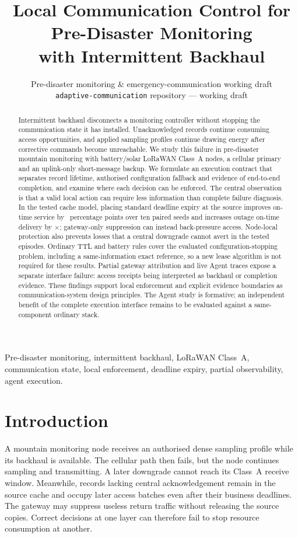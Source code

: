 \documentclass[journal,10pt]{IEEEtran}
\title{\textbf{Local Communication Control for Pre-Disaster Monitoring\\
with Intermittent Backhaul}}
\author{Pre-disaster monitoring \& emergency-communication working draft\\
\texttt{adaptive-communication} repository --- working draft}
\date{}
\begin{document}
\maketitle

\begin{abstract}
Intermittent backhaul disconnects a monitoring controller without stopping the communication
state it has installed. Unacknowledged records continue consuming access opportunities, and
applied sampling profiles continue drawing energy after corrective commands become unreachable.
We study this failure in pre-disaster mountain monitoring with battery/solar LoRaWAN Class~A
nodes, a cellular primary and an uplink-only short-message backup. We formulate an execution
contract that separates record lifetime, authorised configuration fallback and evidence of
end-to-end completion, and examine where each decision can be enforced. The central observation
is that a valid local action can require less information than complete failure diagnosis.
In the tested cache model, placing standard deadline expiry at the source improves on-time
service by \cThreePairedPoints\ percentage points over ten paired seeds and increases outage
on-time delivery by \cThreeRatio$\times$; gateway-only suppression can instead back-pressure
access. Node-local protection also prevents losses that a central downgrade cannot avert in
the tested episodes. Ordinary TTL and battery rules cover the evaluated configuration-stopping
problem, including a same-information exact reference, so a new lease algorithm is not required
for these results. Partial gateway attribution and live Agent traces expose a separate interface
failure: access receipts being interpreted as backhaul or completion evidence. These findings
support local enforcement and explicit evidence boundaries as communication-system design
principles. The Agent study is formative; an independent benefit of the complete execution
interface remains to be evaluated against a same-component ordinary stack.
\end{abstract}

\begin{IEEEkeywords}
Pre-disaster monitoring, intermittent backhaul, LoRaWAN Class~A, communication state,
local enforcement, deadline expiry, partial observability, agent execution.
\end{IEEEkeywords}

\section{Introduction}
A mountain monitoring node receives an authorised dense sampling profile while its backhaul is
available. The cellular path then fails, but the node continues sampling and transmitting. A
later downgrade cannot reach its Class~A receive window. Meanwhile, records lacking central
acknowledgement remain in the source cache and occupy later access batches even after their
business deadlines. The gateway may suppress useless return traffic without releasing the
source copies. Correct decisions at one layer can therefore fail to stop resource consumption
at another.
\end{document}
